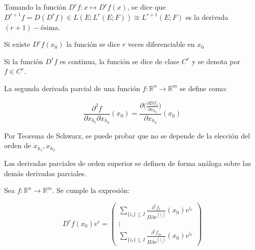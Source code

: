 \begin{defn}
	Tomando la función $D^rf:x\mapsto D^rf(x)$, se dice que $D^{r+1}f = D(D^rf) \in L(E;L^r(E;F)) \cong L^{r+1}(E;F)$ es la derivada $(r+1)-$ésima.
	
	Si existe $D^rf(x_0)$ la función se dice $r$ veces diferenciable en $x_0$
	
	Si la función $D^{r}f$ es continua, la función se dice de clase $C^r$ y se denota por $f \in C^r$.
	
	La segunda derivada parcial de una función $f:\mathbb{R}^n \to \mathbb{R}^m$ se define como:
	
	\begin{equation*}
		\frac{\partial^2 f}{\partial x_{h_i} \partial x_{h_2}} (x_0) =\frac{\partial \bigg(\frac{\partial Df_1}{\partial x_{h_2}}\bigg)}{\partial x_{h_2}} (x_0)
	\end{equation*}
	
	Por Teorema de Schwarz, se puede probar que no se depende de la elección del orden de $x_{h_1},x_{h_2}$
	
	Las derivadas parciales de orden superior se definen de forma análoga sobre las demás derivadas parciales.
\end{defn}

\begin{prop}
	Sea $f:\mathbb{R}^n \to \mathbb{R}^m$. Se cumple la expresión:
	
	\begin{equation*}
		D^r f(x_0) v^r = \begin{pmatrix}
			\displaystyle \sum_{\{i_r\}\subseteq I} \frac{\partial^r f_1}{\Pi \partial x^{(i_j)}} (x_0)v^{i_r} \\
			\vdots\\
			\displaystyle  \sum_{\{i_r\}\subseteq I} \frac{\partial^r f_m}{\Pi \partial x^{(i_j)}}(x_0) v^{i_r} 
		\end{pmatrix} 
	\end{equation*}
\end{prop}

